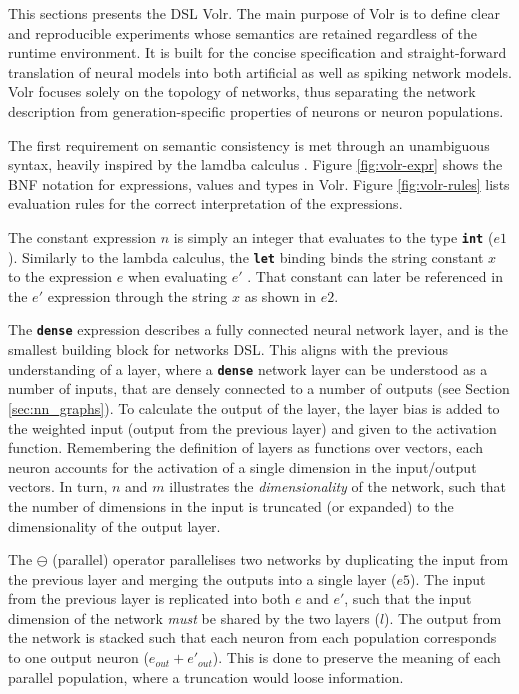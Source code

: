 This sections presents the \gls{DSL} Volr. 
The main purpose of Volr is to define clear and reproducible
experiments whose semantics are retained regardless of
the runtime environment.
It is built for the concise specification and straight-forward
translation of neural models into both artificial as well as
spiking network models.
Volr focuses solely on the topology of networks, thus
separating the network description from generation-specific
properties of neurons or neuron populations.

The first requirement on semantic consistency is met through an unambiguous
syntax, heavily inspired by the lamdba calculus \cite{Pierce2002}.
Figure \ref{fig:volr-expr} shows the BNF notation for expressions, values and types
in Volr. 
Figure \ref{fig:volr-rules} lists evaluation rules for the correct
interpretation of the expressions.




The constant expression $n$ is simply an integer that evaluates to the type 
\texttt{\textbf{int}} ($e1$). 
Similarly to the lambda calculus, the \texttt{\textbf{let}} binding binds
the string constant $x$ to the expression $e$ when evaluating $e'$ \cite{Pierce2002}.
That constant can later be referenced in the $e'$ expression 
through the string $x$ as shown in $e2$.

The \texttt{\textbf{dense}} expression describes a fully connected
neural network layer, and is the smallest building block for networks
\gls{DSL}.
This aligns with the previous understanding of a layer, where
a \texttt{\textbf{dense}} network layer can be understood as a number of inputs,
that are densely connected to a number of outputs (see Section
\ref{sec:nn_graphs}).
To calculate the output of the layer, the layer bias is added to the
weighted input (output from the previous layer) and given 
to the activation function.
Remembering the definition of layers as functions over vectors, each neuron 
accounts for the activation of a single dimension in the input/output vectors.
In turn, $n$ and $m$ illustrates the \textit{dimensionality} of the network,
such that the number of dimensions in the input is truncated (or expanded) to
the dimensionality of the output layer.

The $\ominus$ (parallel) operator parallelises two networks by duplicating
the input from the previous layer and merging the outputs into a single
layer ($e5$).
The input from the previous layer is replicated into both $e$ and $e'$, such
that the input dimension of the network \textit{must} be shared by the two layers ($l$).
The output from the network is stacked such that each neuron from each
population corresponds to one output neuron ($e_{out} + e'_{out}$).
This is done to preserve the meaning of each parallel population, where
a truncation would loose information.

